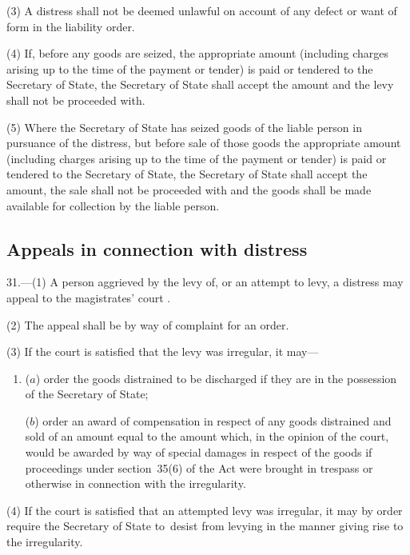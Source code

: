 \documentclass[12pt,a4paper]{article}
\begin{document}
(3) A distress shall not be deemed unlawful on account of any defect or want of form in the liability order.

(4) If, before any goods are seized, the appropriate amount (including charges arising up to the time of the payment or tender) is paid or tendered to the Secretary of State, the Secretary of State shall accept the amount and the levy shall not be proceeded with.

(5) Where the Secretary of State has seized goods of the liable person in pursuance of the distress, but before sale of those goods the appropriate amount (including charges arising up to the time of the payment or tender) is paid or tendered to the Secretary of State, the Secretary of State shall accept the amount, the sale shall not be proceeded with and the goods shall be made available for collection by the liable person.

\subsection[31. Appeals in connection with distress]{Appeals in connection with distress}

31.—(1) A person aggrieved by the levy of, or an attempt to levy, a distress may appeal to the magistrates' court%
.

(2) The appeal shall be by way of complaint for an order.

(3) If the court is satisfied that the levy was irregular, it may—
\begin{enumerate}\item[]
($a$) order the goods distrained to be discharged if they are in the possession of the Secretary of State;

($b$) order an award of compensation in respect of any goods distrained and sold of an amount equal to the amount which, in the opinion of the court, would be awarded by way of special damages in respect of the goods if proceedings under section~35(6) of the Act were brought in trespass or otherwise in connection with the irregularity.
\end{enumerate}

(4) If the court is satisfied that an attempted levy was irregular, it may by order require the Secretary of State to~desist from levying in the manner giving rise to the irregularity.

\end{document}
